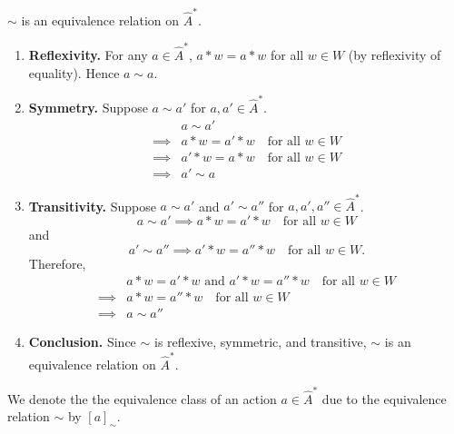 \begin{propositionE}
    $\sim$ is an equivalence relation on $\hat{A}^{*}$.
\end{propositionE}
\begin{proofE}
\begin{enumerate}
    \item \textbf{Reflexivity.}
    For any $a \in \hat{A}^{*}$, $a \ast w = a \ast w$ for all $w \in W$ (by reflexivity of equality). Hence $a \sim a$.
    
    \item \textbf{Symmetry.}
    Suppose $a \sim a'$ for $a, a' \in \hat{A}^{*}$.
    \begin{align}
        & a \sim a' \\
        \implies & a \ast w = a' \ast w \quad \text{for all $w \in W$} \\
        \implies & a' \ast w = a \ast w \quad \text{for all $w \in W$} \\
        \implies & a' \sim a
    \end{align}
    
    \item \textbf{Transitivity.}
    Suppose $a \sim a'$ and $a' \sim a''$ for $a, a', a'' \in \hat{A}^{*}$.
    \begin{equation}
        a \sim a' \implies a \ast w = a' \ast w \quad \text{for all $w \in W$}
    \end{equation}
    and
    \begin{equation}
        a' \sim a'' \implies a' \ast w = a'' \ast w \quad \text{for all $w \in W$}.
    \end{equation}
    Therefore,
    \begin{align}
        & a \ast w = a' \ast w \text{ and } a' \ast w = a'' \ast w \quad \text{for all $w \in W$} \\
        \implies & a \ast w = a'' \ast w \quad \text{for all $w \in W$} \\
        \implies & a \sim a''
    \end{align}

    \item \textbf{Conclusion.}
    Since $\sim$ is reflexive, symmetric, and transitive, $\sim$ is an equivalence relation on $\hat{A}^{*}$.
\end{enumerate}
\end{proofE}

\begin{notation}
    We denote the the equivalence class of an action $a \in \hat{A}^{*}$ due to the equivalence relation $\sim$ by  $[a]_{\sim}$.
\end{notation}

